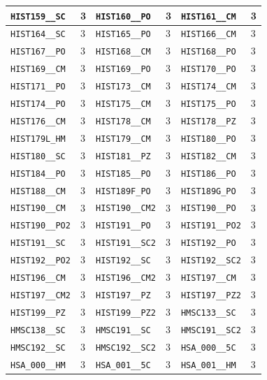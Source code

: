 \begin{longtable}{|l|l||l|l||l|l|}
    \verb|HIST159__SC| & 3 & \verb|HIST160__PO| & 3 & \verb|HIST161__CM| & 3\\\hline
    \verb|HIST164__SC| & 3 & \verb|HIST165__PO| & 3 & \verb|HIST166__CM| & 3\\\hline
    \verb|HIST167__PO| & 3 & \verb|HIST168__CM| & 3 & \verb|HIST168__PO| & 3\\\hline
    \verb|HIST169__CM| & 3 & \verb|HIST169__PO| & 3 & \verb|HIST170__PO| & 3\\\hline
    \verb|HIST171__PO| & 3 & \verb|HIST173__CM| & 3 & \verb|HIST174__CM| & 3\\\hline
    \verb|HIST174__PO| & 3 & \verb|HIST175__CM| & 3 & \verb|HIST175__PO| & 3\\\hline
    \verb|HIST176__CM| & 3 & \verb|HIST178__CM| & 3 & \verb|HIST178__PZ| & 3\\\hline
    \verb|HIST179L_HM| & 3 & \verb|HIST179__CM| & 3 & \verb|HIST180__PO| & 3\\\hline
    \verb|HIST180__SC| & 3 & \verb|HIST181__PZ| & 3 & \verb|HIST182__CM| & 3\\\hline
    \verb|HIST184__PO| & 3 & \verb|HIST185__PO| & 3 & \verb|HIST186__PO| & 3\\\hline
    \verb|HIST188__CM| & 3 & \verb|HIST189F_PO| & 3 & \verb|HIST189G_PO| & 3\\\hline
    \verb|HIST190__CM| & 3 & \verb|HIST190__CM2| & 3 & \verb|HIST190__PO| & 3\\\hline
    \verb|HIST190__PO2| & 3 & \verb|HIST191__PO| & 3 & \verb|HIST191__PO2| & 3\\\hline
    \verb|HIST191__SC| & 3 & \verb|HIST191__SC2| & 3 & \verb|HIST192__PO| & 3\\\hline
    \verb|HIST192__PO2| & 3 & \verb|HIST192__SC| & 3 & \verb|HIST192__SC2| & 3\\\hline
    \verb|HIST196__CM| & 3 & \verb|HIST196__CM2| & 3 & \verb|HIST197__CM| & 3\\\hline
    \verb|HIST197__CM2| & 3 & \verb|HIST197__PZ| & 3 & \verb|HIST197__PZ2| & 3\\\hline
    \verb|HIST199__PZ| & 3 & \verb|HIST199__PZ2| & 3 & \verb|HMSC133__SC| & 3\\\hline
    \verb|HMSC138__SC| & 3 & \verb|HMSC191__SC| & 3 & \verb|HMSC191__SC2| & 3\\\hline
    \verb|HMSC192__SC| & 3 & \verb|HMSC192__SC2| & 3 & \verb|HSA_000__5C| & 3\\\hline
    \verb|HSA_000__HM| & 3 & \verb|HSA_001__5C| & 3 & \verb|HSA_001__HM| & 3\\\hline

\end{longtable}
